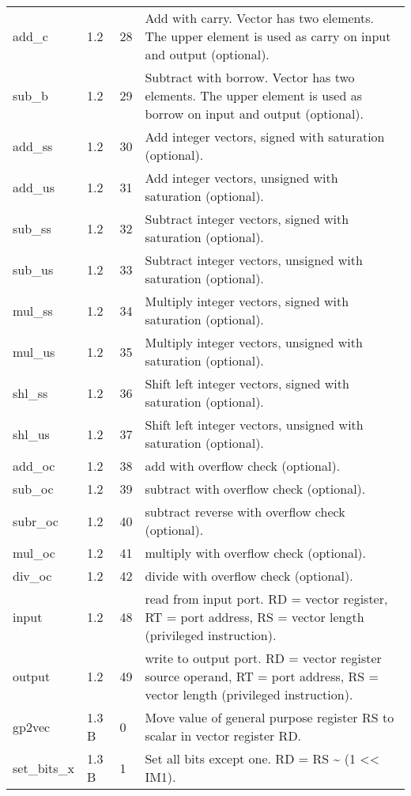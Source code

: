 \documentclass[forwardcom.tex]{subfiles}
\begin{document}
\begin{longtable} {|p{20mm}|p{10mm}|p{8mm}|p{75mm}|}
add\_c        & 1.2 & 28 & Add with carry. Vector has two elements. The upper element is used as carry on input and output (optional). \\
sub\_b        & 1.2 & 29 & Subtract with borrow. Vector has two elements. The upper element is used as borrow on input and output (optional). \\
add\_ss       & 1.2 & 30 & Add integer vectors, signed with saturation (optional). \\
add\_us       & 1.2 & 31 & Add integer vectors, unsigned with saturation (optional). \\
sub\_ss       & 1.2 & 32 & Subtract integer vectors, signed with saturation (optional). \\
sub\_us       & 1.2 & 33 & Subtract integer vectors, unsigned with saturation (optional). \\
mul\_ss       & 1.2 & 34 & Multiply integer vectors, signed with saturation (optional). \\
mul\_us       & 1.2 & 35 & Multiply integer vectors, unsigned with saturation (optional). \\
shl\_ss       & 1.2 & 36 & Shift left integer vectors, signed with saturation (optional). \\
shl\_us       & 1.2 & 37 & Shift left integer vectors, unsigned with saturation (optional). \\
add\_oc       & 1.2 & 38 & add with overflow check (optional). \\
sub\_oc       & 1.2 & 39 & subtract with overflow check (optional). \\
subr\_oc      & 1.2 & 40 & subtract reverse with overflow check (optional). \\
mul\_oc       & 1.2 & 41 & multiply with overflow check (optional). \\
div\_oc       & 1.2 & 42 & divide with overflow check (optional). \\
input         & 1.2 & 48 & read from input port. RD = vector register, RT = port address, RS = vector length (privileged instruction). \\
output        & 1.2 & 49 & write to output port. RD = vector register source operand, RT = port address, RS = vector length (privileged instruction). \\
gp2vec        & 1.3 B &  0 & Move value of general purpose register RS to scalar in vector register RD. \\
set\_bits\_x   & 1.3 B &  1 & Set all bits except one. RD = RS \textbar{} \~{} (1 \textless\textless{} IM1). \\

\end{longtable}
\end{document}
